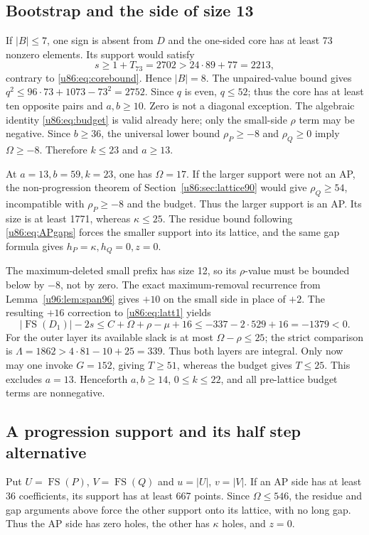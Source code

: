 \documentclass[11pt,a4paper]{article}
\theoremstyle{remark}
\newcommand{\FS}{\operatorname{FS}}
\begin{document}
\subsection{Bootstrap and the side of size 13}
If $|B|\le7$, one sign is absent from $D$ and the one-sided core has at
least 73 nonzero elements. Its support would satisfy
\[
 s\ge1+T_{73}=2702>24\cdot89+77=2213,
\]
contrary to \eqref{u86:eq:corebound}. Hence $|B|=8$. The unpaired-value
bound gives $q^2\le96\cdot73+1073-73^2=2752$.
Since $q$ is even, $q\le52$; thus the core has at least ten opposite
pairs and $a,b\ge10$. Zero is not a diagonal exception. The algebraic
identity \eqref{u86:eq:budget} is valid already here; only the small-side
$\rho$ term may be negative. Since $b\ge36$, the universal lower bound
$\rho_P\ge-8$ and $\rho_Q\ge0$ imply $\Omega\ge-8$.
Therefore $k\le23$ and $a\ge13$.

At $a=13,b=59,k=23$, one has $\Omega=17$. If the larger support were
not an AP, the non-progression theorem of Section~\ref{u86:sec:lattice90}
would give $\rho_Q\ge54$, incompatible with $\rho_P\ge-8$ and the
budget. Thus the larger support is an AP. Its size is at least 1771,
whereas $\kappa\le25$. The residue bound following \eqref{u86:eq:APgaps}
forces the smaller support into its lattice, and the same gap formula
gives $h_P=\kappa,h_Q=0,z=0$.

The maximum-deleted small prefix has size 12, so its $\rho$-value must
be bounded below by $-8$, not by zero. The exact maximum-removal recurrence from
Lemma~\ref{u96:lem:span96} gives $+10$ on the small side in place of $+2$.
The resulting $+16$ correction to \eqref{u86:eq:latt1} yields
\[
 |\FS(D_1)|-2s\le C+\Omega+\rho-\mu+16
 \le-337-2\cdot529+16=-1379<0.
\]
For the outer layer its available slack is at most
$\Omega-\rho\le25$; the strict comparison is
$\Lambda=1862>4\cdot81-10+25=339$.
Thus both layers are integral. Only now may one invoke $G=152$, giving
$T\ge51$, whereas the budget gives $T\le25$. This excludes $a=13$.
Henceforth $a,b\ge14$, $0\le k\le22$, and all pre-lattice budget
terms are nonnegative.

\subsection{A progression support and its half step alternative}
Put $U=\FS(P)$, $V=\FS(Q)$ and $u=|U|$, $v=|V|$.
If an AP side has at least 36 coefficients, its support has at least
667 points. Since $\Omega\le546$, the residue and gap arguments above
force the other support onto its lattice, with no long gap. Thus the
AP side has zero holes, the other has $\kappa$ holes, and $z=0$.
\end{document}
